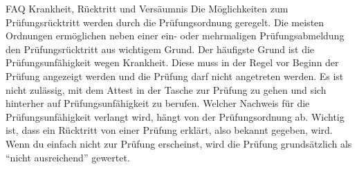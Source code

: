 \begin{artikel}{FAQ Krankheit, Rücktritt und Versäumnis}
Die Möglichkeiten zum Prüfungsrücktritt werden durch die Prüfungsordnung geregelt. Die meisten Ordnungen ermöglichen neben einer ein- oder mehrmaligen Prüfungsabmeldung den Prüfungsrücktritt aus wichtigem Grund. Der häufigste Grund ist die Prüfungsunfähigkeit wegen Krankheit. Diese muss in der Regel vor Beginn der Prüfung angezeigt werden und die Prüfung darf nicht angetreten werden. Es ist nicht zulässig, mit dem Attest in der Tasche zur Prüfung zu gehen und sich hinterher auf Prüfungsunfähigkeit zu berufen. Welcher Nachweis für die Prüfungsunfähigkeit verlangt wird, hängt von der Prüfungsordnung ab. Wichtig ist, dass ein Rücktritt von einer Prüfung erklärt, also bekannt gegeben, wird. Wenn du einfach nicht zur Prüfung erscheinst, wird die Prüfung grundsätzlich als "`nicht ausreichend"' gewertet.
\end{artikel}
